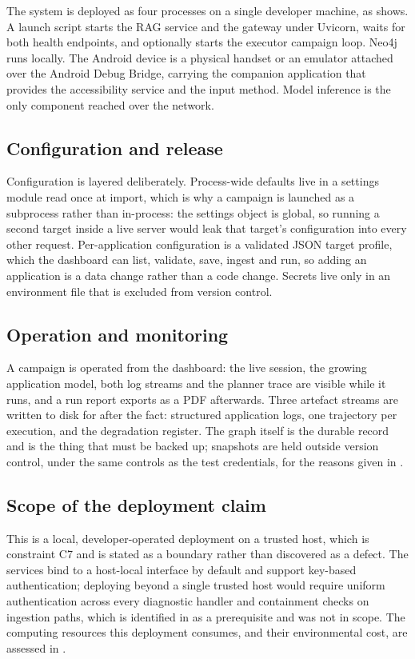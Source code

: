 The system is deployed as four processes on a single developer machine, as
 shows. A launch script starts the RAG service and the
gateway under Uvicorn, waits for both health endpoints, and optionally starts the
executor campaign loop. Neo4j runs locally. The Android device is a physical
handset or an emulator attached over the Android Debug Bridge, carrying the
companion application that provides the accessibility service and the input
method. Model inference is the only component reached over the network.

\subsection{Configuration and release}

Configuration is layered deliberately. Process-wide defaults live in a settings
module read once at import, which is why a campaign is launched as a subprocess
rather than in-process: the settings object is global, so running a second
target inside a live server would leak that target's configuration into every
other request. Per-application configuration is a validated JSON target profile,
which the dashboard can list, validate, save, ingest and run, so adding an
application is a data change rather than a code change. Secrets live only in an
environment file that is excluded from version control.

\subsection{Operation and monitoring}

A campaign is operated from the dashboard: the live session, the growing
application model, both log streams and the planner trace are visible while it
runs, and a run report exports as a PDF afterwards. Three artefact streams are
written to disk for after the fact: structured application logs, one trajectory
per execution, and the degradation register. The graph itself is the durable
record and is the thing that must be backed up; snapshots are held outside
version control, under the same controls as the test credentials, for the
reasons given in .

\subsection{Scope of the deployment claim}

This is a local, developer-operated deployment on a trusted host, which is
constraint C7 and is stated as a boundary rather than discovered as a defect.
The services bind to a host-local interface by default and support key-based
authentication; deploying beyond a single trusted host would require uniform
authentication across every diagnostic handler and containment checks on
ingestion paths, which is identified in  as a prerequisite
and was not in scope. The computing resources this deployment consumes, and
their environmental cost, are assessed in .
